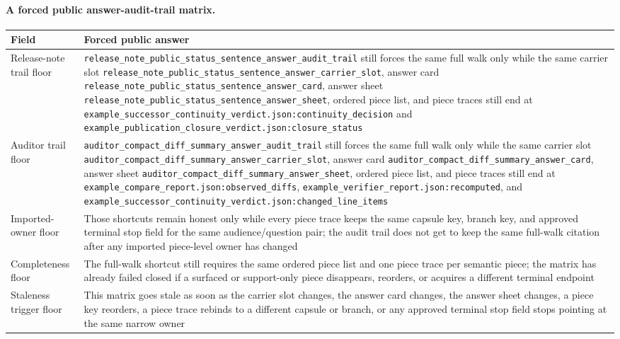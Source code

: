 \documentclass[11pt]{article}
\begin{document}
\paragraph{A forced public answer-audit-trail matrix.}
\begin{table}[t]
\centering
\small
\begin{tabularx}{\linewidth}{@{}lX@{}}
\toprule
Field & Forced public answer \\
\midrule
Release-note trail floor & \nolinkurl{release_note_public_status_sentence_answer_audit_trail} still forces the same full walk only while the same carrier slot \nolinkurl{release_note_public_status_sentence_answer_carrier_slot}, answer card \nolinkurl{release_note_public_status_sentence_answer_card}, answer sheet \nolinkurl{release_note_public_status_sentence_answer_sheet}, ordered piece list, and piece traces still end at \nolinkurl{example_successor_continuity_verdict.json:continuity_decision} and \nolinkurl{example_publication_closure_verdict.json:closure_status} \\
Auditor trail floor & \nolinkurl{auditor_compact_diff_summary_answer_audit_trail} still forces the same full walk only while the same carrier slot \nolinkurl{auditor_compact_diff_summary_answer_carrier_slot}, answer card \nolinkurl{auditor_compact_diff_summary_answer_card}, answer sheet \nolinkurl{auditor_compact_diff_summary_answer_sheet}, ordered piece list, and piece traces still end at \nolinkurl{example_compare_report.json:observed_diffs}, \nolinkurl{example_verifier_report.json:recomputed}, and \nolinkurl{example_successor_continuity_verdict.json:changed_line_items} \\
Imported-owner floor & Those shortcuts remain honest only while every piece trace keeps the same capsule key, branch key, and approved terminal stop field for the same audience/question pair; the audit trail does not get to keep the same full-walk citation after any imported piece-level owner has changed \\
Completeness floor & The full-walk shortcut still requires the same ordered piece list and one piece trace per semantic piece; the matrix has already failed closed if a surfaced or support-only piece disappears, reorders, or acquires a different terminal endpoint \\
Staleness trigger floor & This matrix goes stale as soon as the carrier slot changes, the answer card changes, the answer sheet changes, a piece key reorders, a piece trace rebinds to a different capsule or branch, or any approved terminal stop field stops pointing at the same narrow owner \\

\end{tabularx}
\end{table}
\end{document}
